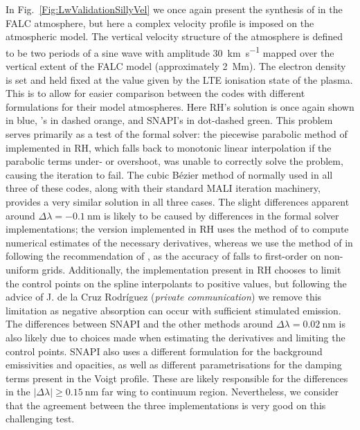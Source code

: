 In Fig.~\ref{Fig:LwValidationSillyVel} we once again present the synthesis of \CaLine{} in the FALC atmosphere, but here a complex velocity profile is imposed on the atmospheric model.
The vertical velocity structure of the atmosphere is defined to be two periods of a sine wave with amplitude \SI{30}{\kilo\metre\per\second} mapped over the vertical extent of the FALC model (approximately \SI{2}{\mega\metre}).
The electron density is set and held fixed at the value given by the LTE ionisation state of the plasma.
This is to allow for easier comparison between the codes with different formulations for their model atmospheres.
Here RH's solution is once again shown in blue, \Lw{}'s in dashed orange, and SNAPI's in dot-dashed green.
This problem serves primarily as a test of the formal solver: the piecewise parabolic method of \citet{Auer1994} implemented in RH, which falls back to monotonic linear interpolation if the parabolic terms under- or overshoot, was unable to correctly solve the problem, causing the iteration to fail.
The cubic Bézier method of \citet{DelaCruzRodriguez2013} normally used in all three of these codes, along with their standard MALI iteration machinery, provides a very similar solution in all three cases.
The slight differences apparent around $\Delta\lambda=\SI{-0.1}{\nano\metre}$ is likely to be caused by differences in the formal solver implementations; the version implemented in RH uses the method of \citet{Fritsch1984} to compute numerical estimates of the necessary derivatives, whereas we use the method of \citet{Steffen1990} in \Lw{} following the recommendation of \citet{Janett2018}, as the accuracy of \citet{Fritsch1984} falls to first-order on non-uniform grids.
Additionally, the implementation present in RH chooses to limit the control points on the spline interpolants to positive values, but following the advice of J. de la Cruz Rodríguez (\emph{private communication}) we remove this limitation as negative absorption can occur with sufficient stimulated emission.
The differences between SNAPI and the other methods around $\Delta\lambda=\SI{0.02}{\nano\metre}$ is also likely due to choices made when estimating the derivatives and limiting the control points.
SNAPI also uses a different formulation for the background emissivities and opacities, as well as different parametrisations for the damping terms present in the Voigt profile.
These are likely responsible for the differences in the $|\Delta\lambda| \geq \SI{0.15}{\nano\metre}$ far wing to continuum region.
Nevertheless, we consider that the agreement between the three implementations is very good on this challenging test.

